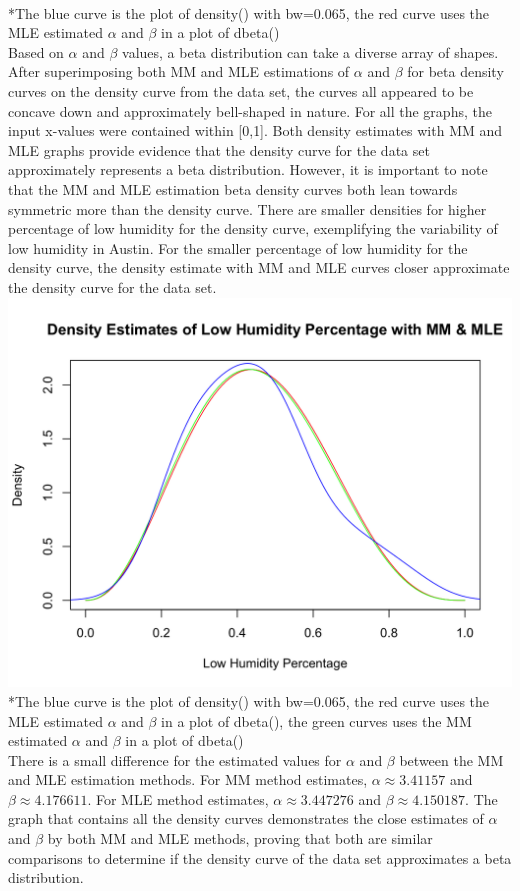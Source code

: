 \documentclass[12pt, letterpaper]{article}
\begin{document}
\footnotesize
\\ \**The blue curve is the plot of density() with bw=0.065, the red curve uses the MLE estimated ${\alpha}$ and ${\beta}$ in a plot of dbeta() \\
\normalsize 
Based on ${\alpha}$ and ${\beta}$ values, a beta distribution can take a diverse array of shapes. After superimposing both MM and MLE estimations of ${\alpha}$ and ${\beta}$ for beta density curves on the density curve from the data set, the curves all appeared to be concave down and approximately bell-shaped in nature. For all the graphs, the input x-values were contained within [0,1]. Both density estimates with MM and MLE graphs provide evidence that the density curve for the data set approximately represents a beta distribution. However, it is important to note that the MM and MLE estimation beta density curves both lean towards symmetric more than the density curve. There are smaller densities for higher percentage of low humidity for the density curve, exemplifying the variability of low humidity in Austin. For the smaller percentage of low humidity for the density curve, the density estimate with MM and MLE curves closer approximate the density curve for the data set. 
\includegraphics[scale=0.32]{austinweather_mmmle.png}
\footnotesize
\\ \**The blue curve is the plot of density() with bw=0.065, the red curve uses the MLE estimated ${\alpha}$ and ${\beta}$ in a plot of dbeta(), the green curves uses the MM estimated ${\alpha}$ and ${\beta}$ in a plot of dbeta() \\
\normalsize 
There is a small difference for the estimated values for ${\alpha}$ and ${\beta}$ between the MM and MLE estimation methods. For MM method estimates, ${\alpha \approx} 3.41157$ and ${\beta \approx} 4.176611$. For MLE method estimates, ${\alpha \approx} 3.447276$ and ${\beta \approx} 4.150187$. The graph that contains all the density curves demonstrates the close estimates of ${\alpha}$ and ${\beta}$ by both MM and MLE methods, proving that both are similar comparisons to determine if the density curve of the data set approximates a beta distribution.\\
\end{document}
